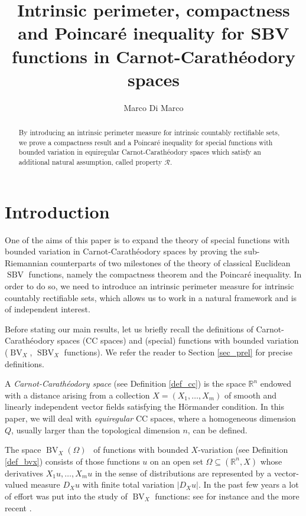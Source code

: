 \documentclass[12pt,a4paper]{amsart}
\author[M. Di Marco]{Marco Di Marco}
\title[Intr. perimeter, compactness and Poincaré ineq. for SBV functions in CC spaces]{Intrinsic perimeter, compactness and Poincaré inequality for SBV functions in Carnot-Carathéodory spaces}
\theoremstyle{definition}
\theoremstyle{plain}
\newcommand{\R}{\mathbb{R}}
\newcommand{\se}{\subseteq}
\newcommand{\sbv}{\operatorname{SBV}}
\newcommand{\bv}{\operatorname{BV}}
\begin{document}
\begin{abstract}
By introducing an intrinsic perimeter measure for intrinsic countably rectifiable sets, we prove a compactness result and a Poincaré inequality for special functions with bounded variation in equiregular Carnot-Carathéodory spaces which satisfy an additional natural assumption, called property $\mathcal R$. 
\end{abstract}

\maketitle



\section{Introduction}

One of the aims of this paper is to expand the theory of special functions with bounded variation in Carnot-Carathéodory spaces by proving the sub-Riemannian counterparts of two milestones of the theory of classical Euclidean $\sbv$ functions, namely the compactness theorem and the Poincaré inequality. In order to do so, we need to introduce an intrinsic perimeter measure for intrinsic countably rectifiable sets, which allows us to work in a natural framework and is of independent interest.

Before stating our main results, let us briefly recall the definitions of Carnot-Carathéodory spaces (CC spaces) and (special) functions with bounded variation ($\bv_X$, $\sbv_X$ functions). We refer the reader to Section \ref{sec_prel} for precise definitions.

A {\em Carnot-Carathéodory space} (see Definition \ref{def_cc}) is the space $\R^n$ endowed with a distance arising from a collection $X=(X_1,\dots,X_m)$ of smooth and linearly independent vector fields satisfying the H\"ormander condition. In this paper, we will deal with {\em equiregular} CC spaces, where a homogeneous dimension $Q$, usually larger than the topological dimension $n$, can be defined. 




The space $\bv_X(\Omega)$~\cite{cdg,fssc} of functions with bounded $X$-variation (see Definition \ref{def_bvx}) consists of those functions $u$ on an open set $\Omega\se (\R^n,X)$ whose derivatives $X_1u, \dots, X_mu$ in the sense of distributions are represented by a vector-valued measure $D_Xu$ with finite total variation $|D_Xu|$. In the past few years a lot of effort was put into the study of $\bv_X$ functions: see for instance \cite{bu95,dgn98,fgw94,fssc01,fssc03,gn96,garofalonhieu,CapGarAhlfors,DanGarNhi,Selby} and the more recent \cite{agm15,am03,as10,bmp12,cm20,dmv19,magnani02,marchi14,sy03,vittone2012,dontesi,dv,dv19,sbvx}.
\end{document}
